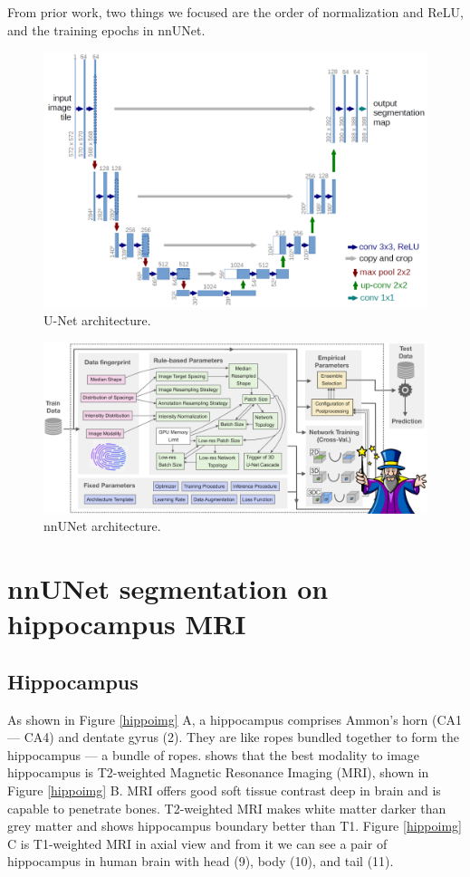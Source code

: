 \documentclass{article}
\begin{document}
From prior work, two things we focused are the order of normalization and ReLU, and the training epochs in nnUNet.

\begin{figure}
  \centering
  \includegraphics[scale=0.18]{./figs/unetarch.png}
  \caption{U-Net architecture.}
  \label{unetarch}
\end{figure}

\begin{figure}
  \centering
  \includegraphics[scale=0.22]{./figs/nnunetarch.png}
  \caption{nnUNet architecture.}
  \label{nnunetarch}
\end{figure}

\section{nnUNet segmentation on hippocampus MRI}

\subsection{Hippocampus}

As shown in Figure \ref{hippoimg} A, a hippocampus comprises Ammon's horn (CA1 --- CA4) and dentate gyrus (2). They are like ropes bundled together to form the hippocampus --- a bundle of ropes. \citet{alves2022imaging} shows that the best modality to image hippocampus is T2-weighted Magnetic Resonance Imaging (MRI), shown in Figure \ref{hippoimg} B. MRI offers good soft tissue contrast deep in brain and is capable to penetrate bones. T2-weighted MRI makes white matter darker than grey matter and shows hippocampus boundary better than T1. Figure \ref{hippoimg} C is T1-weighted MRI in axial view and from it we can see a pair of hippocampus in human brain with head (9), body (10), and tail (11).
\end{document}
